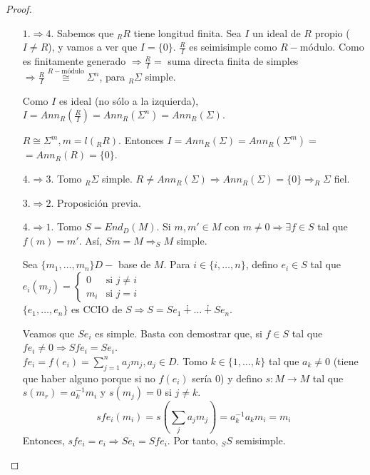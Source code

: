 \documentclass[11pt,a4paper]{article}
\theoremstyle{break}
\begin{document}
\begin{proof} \
\begin{enumerate}
\item [$1. \Rightarrow 4.$] Sabemos que $_{R}R$ tiene longitud finita. Sea $I$ un ideal de $R$ propio ($I \neq R$), y vamos a ver que $I = \{0\}$. $\frac{R}{I}$ es seimisimple como $R-$módulo. Como es finitamente generado $\Rightarrow \frac{R}{I} =$ suma directa finita de simples $\Rightarrow \frac{R}{I} \overset{R-\text{módulo}}{\cong} \Sigma^{n}$, para $_{R}\Sigma$ simple.

Como $I$ es ideal (no sólo a la izquierda), $I = Ann_{R}(\frac{R}{I}) = Ann_{R}(\Sigma^{n}) = Ann_{R}(\Sigma)$.

$R \cong \Sigma^{m}, m = l(_{R}R)$. Entonces $I = Ann_{R}(\Sigma) = Ann_{R}(\Sigma^{m}) =$ \\ $= Ann_{R}(R) = \{0\}$.
\item [$4. \Rightarrow 3.$] Tomo $_{R}\Sigma$ simple. $R \neq Ann_{R}(\Sigma) \Rightarrow Ann_{R}(\Sigma) = \{0\} \Rightarrow _{R}\Sigma$ fiel.
\item [$3. \Rightarrow 2.$] Proposición previa.
\item [$4. \Rightarrow 1.$] Tomo $S = End_{D}(M)$. Si $m, m' \in M$ con $m \neq 0 \Rightarrow \exists f \in S$ tal que $f(m) = m'$. Así, $Sm = M \Rightarrow _{S}M$ simple.

Sea $\{m_{1}, \dots, m_{n}\} D-$ base de $M$. Para $i \in \{i, \dots, n\}$, defino $e_{i} \in S$ tal que $e_{i}(m_{j}) = \begin{cases}
0 & \text{si } j \neq i \\
m_{i} & \text{si } j = i
\end{cases}$ \\
$\{e_{1}, \dots, e_{n}\}$ es CCIO de $S \Rightarrow S = Se_{1} \dotplus \dots \dotplus Se_{n}$.

Veamos que $Se_{i}$ es simple. Basta con demostrar que, si $f \in S$ tal que $fe_{i} \neq 0 \Rightarrow Sfe_{i} = Se_{i}$. \\
$fe_{i} = f(e_{i}) = \sum\limits_{j=1}^{n} a_{j}m_{j}, a_{j} \in D$. Tomo $k \in \{1, \dots, k\}$ tal que $a_{k} \neq 0$ (tiene que haber alguno porque si no $f(e_{i})$ sería 0) y defino $s: M \to M$ tal que $s(m_{r}) = a_{k}^{-1}m_{i}$ y $s(m_{j}) = 0$ si $j \neq k$.
$$sfe_{i}(m_{i}) = s(\sum\limits_{j}a_{j}m_{j}) = a_{k}^{-1}a_{k}m_{i}=m_{i}$$
Entonces, $sfe_{i} = e_{i} \Rightarrow Se_{i} = Sfe_{i}$. Por tanto, $_{S}S$ semisimple.



\end{enumerate}
\end{proof}
\end{document}
